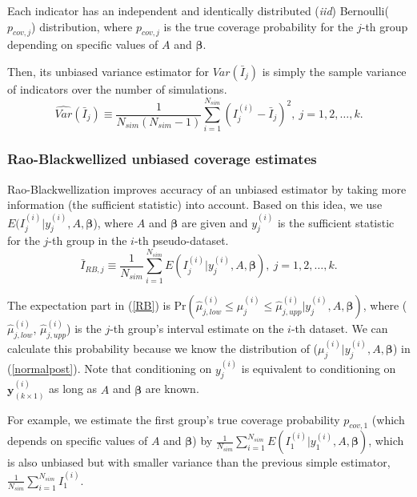 \documentclass[article]{jss}
\begin{document}
Each indicator has an independent and identically distributed (\emph{iid}) Bernoulli($p_{cov, j}$) distribution, where $p_{cov, j}$ is the true coverage probability for the $j$-th group depending on specific values of $A$ and $\boldsymbol{\beta}$. 

Then, its unbiased variance estimator  for $Var(\bar{I}_{j})$ is simply the sample variance of indicators over the number of simulations.
\begin{equation}\label{svar}
\widehat{Var}(\bar{I}_{j})\equiv\frac{1}{N_{sim}(N_{sim}-1)}\sum_{i=1}^{N_{sim}}(I^{(i)}_{j}-\bar{I}_{j})^{2},~ j=1, 2, \ldots, k.
\end{equation}


\subsubsection{Rao-Blackwellized unbiased coverage estimates}
Rao-Blackwellization improves accuracy of an unbiased estimator by taking more information (the sufficient statistic) into account. Based on this idea, we use $E(I^{(i)}_{j}\vert y^{(i)}_{j}, A, \boldsymbol{\beta}$), where $A$ and $\boldsymbol{\beta}$ are given and $y^{(i)}_{j}$ is the sufficient statistic for the $j$-th group in the $i$-th pseudo-dataset. 
\begin{equation}\label{RB}
\bar{I}_{RB, j}\equiv \frac{1}{N_{sim}}\sum_{i=1}^{N_{sim}}E(I^{(i)}_{j}\vert y^{(i)}_{j}, A, \boldsymbol{\beta}),~ j=1, 2, \ldots, k.
\end{equation}

The expectation part in (\ref{RB}) is Pr$(\hat{\mu}^{(i)}_{j, low}\le \mu^{(i)}_{j} \le\hat{\mu}^{(i)}_{j, upp}\vert y^{(i)}_{j}, A, \boldsymbol{\beta})$, where ($\hat{\mu}^{(i)}_{j, low}$, $\hat{\mu}^{(i)}_{j, upp}$) is the $j$-th group's interval estimate on the $i$-th dataset. We can calculate this probability  because we know the distribution of ($\mu^{(i)}_{j} \vert y^{(i)}_{j}, A, \boldsymbol{\beta}$) in (\ref{normalpost}). Note that conditioning on $y^{(i)}_{j}$ is equivalent to conditioning on $\boldsymbol{y}^{(i)}_{(k\times1)}$ as long as $A$ and $\boldsymbol{\beta}$ are known. 

For example, we estimate the first group's true coverage probability $p_{cov, 1}$ (which depends on specific values of $A$ and $\boldsymbol{\beta}$) by $\frac{1}{N_{sim}}\sum_{i=1}^{N_{sim}}E(I^{(i)}_{1}\vert y^{(i)}_{1}, A, \boldsymbol{\beta})$, which is also unbiased but with smaller variance than the previous simple estimator, $\frac{1}{N_{sim}}\sum_{i=1}^{N_{sim}}I^{(i)}_{1}$.
\end{document}
